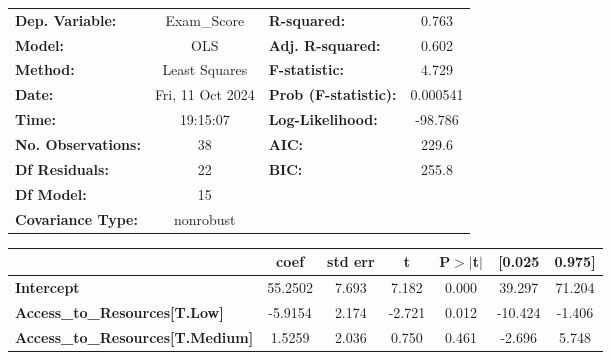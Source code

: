 \documentclass[11pt]{article}
\newcommand{\prompt}[4]{
        {\ttfamily\llap{{\color{#2}[#3]:\hspace{3pt}#4}}\vspace{-\baselineskip}}
    }
\begin{document}
            
\prompt{Out}{outcolor}{148}{}
    
    \begin{center}
\begin{tabular}{lclc}
\toprule
\textbf{Dep. Variable:}                             &   Exam\_Score    & \textbf{  R-squared:         } &     0.763   \\
\textbf{Model:}                                     &       OLS        & \textbf{  Adj. R-squared:    } &     0.602   \\
\textbf{Method:}                                    &  Least Squares   & \textbf{  F-statistic:       } &     4.729   \\
\textbf{Date:}                                      & Fri, 11 Oct 2024 & \textbf{  Prob (F-statistic):} &  0.000541   \\
\textbf{Time:}                                      &     19:15:07     & \textbf{  Log-Likelihood:    } &   -98.786   \\
\textbf{No. Observations:}                          &          38      & \textbf{  AIC:               } &     229.6   \\
\textbf{Df Residuals:}                              &          22      & \textbf{  BIC:               } &     255.8   \\
\textbf{Df Model:}                                  &          15      & \textbf{                     } &             \\
\textbf{Covariance Type:}                           &    nonrobust     & \textbf{                     } &             \\
\bottomrule
\end{tabular}
\begin{tabular}{lcccccc}
                                                    & \textbf{coef} & \textbf{std err} & \textbf{t} & \textbf{P$> |$t$|$} & \textbf{[0.025} & \textbf{0.975]}  \\
\midrule
\textbf{Intercept}                                  &      55.2502  &        7.693     &     7.182  &         0.000        &       39.297    &       71.204     \\
\textbf{Access\_to\_Resources[T.Low]}               &      -5.9154  &        2.174     &    -2.721  &         0.012        &      -10.424    &       -1.406     \\
\textbf{Access\_to\_Resources[T.Medium]}            &       1.5259  &        2.036     &     0.750  &         0.461        &       -2.696    &        5.748     \\

\end{tabular}
\end{center}
\end{document}
